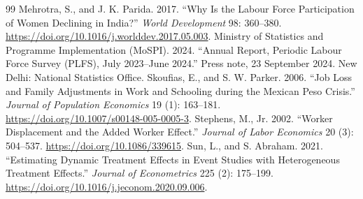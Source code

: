 \begin{thebibliography}{99}
 Mehrotra, S., and J. K. Parida. 2017. ``Why Is the Labour Force Participation of Women Declining in India?'' \textit{World Development} 98: 360--380. \url{https://doi.org/10.1016/j.worlddev.2017.05.003}.
 Ministry of Statistics and Programme Implementation (MoSPI). 2024. ``Annual Report, Periodic Labour Force Survey (PLFS), July 2023--June 2024.'' Press note, 23 September 2024. New Delhi: National Statistics Office.
 Skoufias, E., and S. W. Parker. 2006. ``Job Loss and Family Adjustments in Work and Schooling during the Mexican Peso Crisis.'' \textit{Journal of Population Economics} 19 (1): 163--181. \url{https://doi.org/10.1007/s00148-005-0005-3}.
 Stephens, M., Jr. 2002. ``Worker Displacement and the Added Worker Effect.'' \textit{Journal of Labor Economics} 20 (3): 504--537. \url{https://doi.org/10.1086/339615}.
 Sun, L., and S. Abraham. 2021. ``Estimating Dynamic Treatment Effects in Event Studies with Heterogeneous Treatment Effects.'' \textit{Journal of Econometrics} 225 (2): 175--199. \url{https://doi.org/10.1016/j.jeconom.2020.09.006}.
\end{thebibliography}
